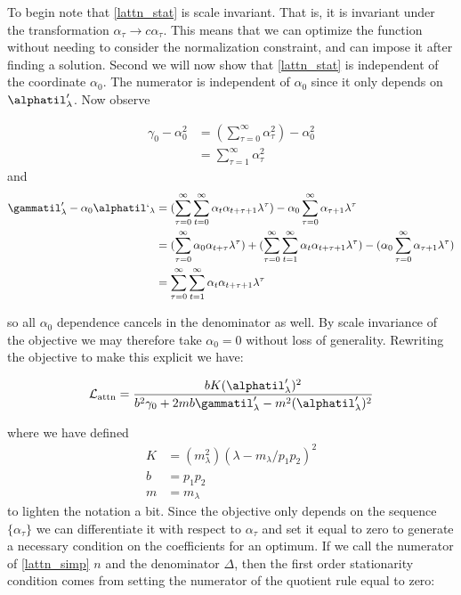 \documentclass{article}
\begin{document}
To begin note that \eqref{lattn_stat} is scale invariant. That is, it is invariant under the transformation $\alpha_\tau \to c\alpha_\tau$. This means that we can optimize the function without needing to consider the normalization constraint, and can impose it after finding a solution. Second we will now show that \eqref{lattn_stat} is independent of the coordinate $\alpha_0$. The numerator is independent of $\alpha_0$ since it only depends on $\alphatil'_\lambda$. Now observe

\begin{align}
    \gamma_0 - \alpha_0^2 &= (\sum_{\tau=0}^\infty \alpha_\tau^2) - \alpha_0^2 \\
    &= \sum_{\tau=1}^\infty \alpha_\tau^2
\end{align}
 and 
 \begin{align}
    \gammatil'_\lambda - \alpha_0\alphatil`_\lambda &= (\sum_{\tau=0}^\infty\sum_{t=0}^\infty \alpha_t \alpha_{t+\tau+1}\lambda^\tau) - \alpha_0\sum_{\tau=0}^\infty \alpha_{\tau+1}\lambda^\tau \\
    &= (\sum_{\tau=0}^\infty\alpha_0 \alpha_{t+\tau}\lambda^\tau) + (\sum_{\tau=0}^\infty\sum_{t=1}^\infty \alpha_t \alpha_{t+\tau+1}\lambda^\tau) - ( \alpha_0\sum_{\tau=0}^\infty \alpha_{\tau+1}\lambda^\tau)\\
    &= \sum_{\tau=0}^\infty\sum_{t=1}^\infty \alpha_t \alpha_{t+\tau+1}\lambda^\tau
\end{align}

so all $\alpha_0$ dependence cancels in the denominator as well. By scale invariance of the objective we may therefore take $\alpha_0 = 0$ without loss of generality. Rewriting the objective to make this explicit we have:

\begin{equation}\label{lattn_simp}
    \mathcal{L}_{\text{attn}} = \frac{bK (\alphatil'_\lambda)^2}{b^2\gamma_0 + 2mb\gammatil_\lambda' - m^2(\alphatil'_\lambda)^2}
\end{equation}

where we have defined 
\begin{align}
    K &= (m_\lambda^2)(\lambda - m_\lambda/p_1p_2)^2\\
    b &= p_1p_2 \\
    m &= m_\lambda
\end{align}
to lighten the notation a bit. Since the objective only depends on the sequence $\{\alpha_\tau\}$ we can differentiate it with respect to $\alpha_\tau$ and set it equal to zero to generate a necessary condition on the coefficients for an optimum. If we call the numerator of \eqref{lattn_simp} $n$ and the denominator $\Delta$, then the first order stationarity condition comes from setting the numerator of the quotient rule equal to zero:
\end{document}
